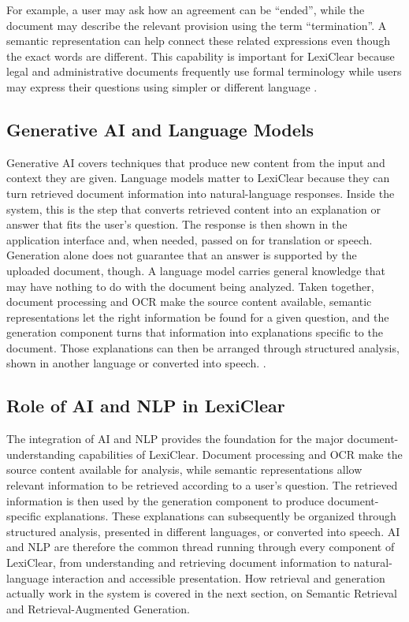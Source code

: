 \documentclass[12pt,a4paper,oneside]{report}
\begin{document}
For example, a user may ask how an agreement can be ``ended'', while the
document may describe the relevant provision using the term
``termination''. A semantic representation can help connect these related
expressions even though the exact words are different. This capability is important for LexiClear because legal and administrative
documents frequently use formal terminology while users may express their
questions using simpler or different language \cite{reimers2019sbert}.

\subsection{Generative AI and Language Models}

Generative AI covers techniques that produce new content from the input and context they are given. Language models matter to LexiClear because they can turn retrieved document information into natural-language responses. Inside the system, this is the step that converts retrieved content into an explanation or answer that fits the user's question. The response is then shown in the application interface and, when needed, passed on for translation or speech. Generation alone does not guarantee that an answer is supported by the uploaded document, though. A language model carries general knowledge that may have nothing to do with the document being analyzed. Taken together, document processing and OCR make the source content available, semantic representations let the right information be found for a given question, and the generation component turns that information into explanations specific to the document. Those explanations can then be arranged through structured analysis, shown in another language or converted into speech. \cite{basha2024,lewis2020rag}.

\subsection{Role of AI and NLP in LexiClear}

The integration of AI and NLP provides the foundation for the major
document-understanding capabilities of LexiClear. Document processing and
OCR make the source content available for analysis, while semantic
representations allow relevant information to be retrieved according to a
user's question. The retrieved information is then used by the generation component to
produce document-specific explanations. These explanations can subsequently
be organized through structured analysis, presented in different languages,
or converted into speech. AI and NLP are therefore the common thread running through every component of LexiClear, from understanding and retrieving document information to natural-language interaction and accessible presentation. How retrieval and generation actually work in the system is covered in the next section, on Semantic Retrieval and Retrieval-Augmented Generation.
\end{document}
